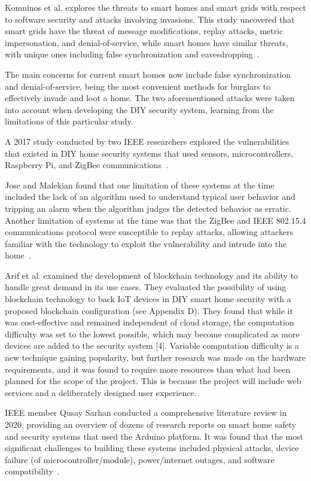 Komninos et al. %
explores the threats to smart homes and smart grids with respect to
software security and attacks involving invasions. %
This study uncovered that smart grids have the threat of message modifications, replay attacks, metric impersonation, and
denial-of-service, while smart homes have similar threats, with unique ones including
false synchronization and eavesdropping~\cite{komninosEtAl2014}. %

The main concerns for current smart homes now include false synchronization and denial-of-service, being the
most convenient methods for burglars to effectively invade and loot a home. %
The two aforementioned attacks were taken into account when developing the DIY security system,
learning from the limitations of this particular study. %

A 2017 study conducted by two IEEE researchers explored the vulnerabilities that existed
in DIY home security systems that used sensors, microcontrollers, Raspberry Pi, and ZigBee
communications~\cite{joseMalekian2017}. %


Jose and Malekian found that one limitation of these systems at the time included the
lack of an algorithm used to understand typical
user behavior and tripping an alarm when the algorithm judges the detected behavior as
erratic. %
Another limitation of systems at the time was that the ZigBee and IEEE 802.15.4
communications protocol were susceptible to replay attacks, allowing attackers familiar
with the technology to exploit the vulnerability and intrude
into the home~\cite{joseMalekian2017}. %

Arif et al. %
examined the development of blockchain technology and its ability to
handle great demand in its use cases. %
They evaluated the possibility of using blockchain technology to back IoT devices in DIY
smart home security with a proposed blockchain
configuration (see Appendix D). They found that while it was cost-effective and remained
independent of cloud storage, the computation difficulty was set to the lowest possible,
which may become complicated as more devices are added to the security system [4]. %
Variable computation difficulty is a new technique gaining popularity, but further
research was made on the hardware requirements, and it was found to require more
resources than what had been planned for the scope of the project. %
This is because the project will include web services and a deliberately
designed user experience. %

IEEE member Qusay Sarhan conducted a comprehensive literature review in 2020, providing an
overview of dozens of research reports on smart home safety and security systems that
used the Arduino platform. %
It was found that the most significant challenges to building these systems included physical attacks, device failure (of microcontroller/module),
power/internet outages, and software compatibility~\cite{sarhan2020}. %

